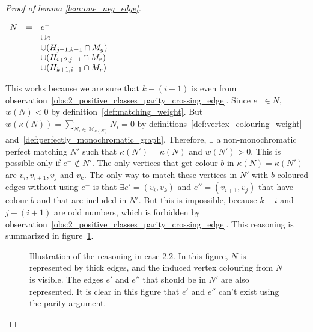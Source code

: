 \begin{proof}[Proof of lemma \ref{lem:one_neg_edge}]
\begin{enumerate}
\begin{enumerate}
                \begin{center}
                    $\begin{array}{r c l}
                        N & = & e^-                                 \\
                          &   & \cup e                              \\
                          &   & \cup (H_{j+1, k-1} \cap M_g)        \\
                          &   & \cup (H_{i + 2, j - 1} \cap M_r)    \\
                          &   & \cup (H_{k+1, i-1} \cap M_r)
                    \end{array}$
                \end{center}

                This works because we are sure that $k - (i + 1)$ is even from observation~\ref{obs:2_positive_classes_parity_crossing_edge}.
                Since $e^- \in N$, $w(N) < 0$ by definition~\ref{def:matching_weight}.
                But $w(\kappa(N)) = \sum\limits_{N_i \in \mathcal{M}_{\kappa(N)}} N_i = 0$ by definitions~\ref{def:vertex_colouring_weight} and~\ref{def:perfectly_monochromatic_graph}.
                Therefore, $\exists$ a non-monochromatic perfect matching $N'$ such that $\kappa(N') = \kappa(N)$ and $w(N') > 0$.
                This is possible only if $e^- \notin N'$.
                The only vertices that get colour $b$ in $\kappa(N) = \kappa(N')$ are $v_i, v_{i+1}, v_j$ and $v_k$.
                The only way to match these vertices in $N'$ with $b$-coloured edges without using $e^-$ is that $\exists e' = (v_i, v_k)$ and $e'' = (v_{i+1}, v_j)$ that have colour $b$ and that are included in $N'$.
                But this is impossible, because $k-i$ and $j-(i+1)$ are odd numbers, which is forbidden by observation~\ref{obs:2_positive_classes_parity_crossing_edge}.
                This reasoning is summarized in figure~\ref{fig:unique_neg_2_2}.

                \begin{figure}[H]
                    \caption{Illustration of the reasoning in case 2.2. In this figure, $N$ is represented by thick edges, and the induced vertex colouring from $N$ is visible. The edges $e'$ and $e''$ that should be in $N'$ are also represented. It is clear in this figure that $e'$ and $e''$ can't exist using the parity argument.}
                    \label{fig:unique_neg_2_2}
                \end{figure}


\end{enumerate}
\end{enumerate}
\end{proof}
